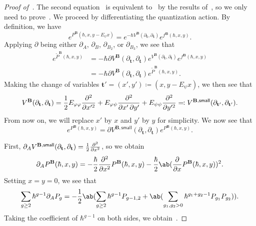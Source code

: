\documentclass[10pt]{amsart}
\theoremstyle{definition}
\theoremstyle{remark}
\theoremstyle{plain}
\theoremstyle{definition}
\theoremstyle{remark}
\newcommand{\bB}{\mathbf{B}}
\newcommand{\bt}{\mathbf{t}}
\newcommand{\ms}[1]{\mathsf{#1}}
\newcommand{\1}{\mathbf{1}}
\newcommand{\2}{\mathbf{2}}
\newcommand{\3}{\mathbf{3}}
\numberwithin{equation}{section}
\begin{document}
\begin{proof}[Proof of~]
    The second equation~ is equivalent to~ by the results of~\cite{yy04}, so we only need to prove~.
    We proceed by differentiating the quantization action. By definition, we have
    \[ e^{P^{\bB}(\hbar, x, y-E_{\psi}x)} = e^{-\hbar V^{\bB}(\partial_{\bt}, \partial_{\bt})} e^{f^{\bB}(\hbar, x, y)}. \]
    Applying $\partial$ being either $\partial_A$, $\partial_B$, $\partial_{B_2}$, or $\partial_{B_3}$, we see that
    \begin{align*}
        e^{\tilde{P}^{\bB}(\hbar, x, y)} &= -\hbar \partial V^{\bB}(\partial_{\bt}, \partial_{\bt}) e^{V^{\bB}(\partial_{\bt}, \partial_{\bt})} e^{f^{\bB}(\hbar, x, y)} \\
        &= -\hbar \partial V^{\bB}(\partial_{\bt}, \partial_{\bt}) e^{\tilde{P}^{\bB}(\hbar, x, y)}.
    \end{align*}
    Making the change of variables $\bt' = (x',y') \coloneqq (x, y-E_{\psi}x)$, we then see that
    \[ V^{\bB}(\partial_{\bt}, \partial_{\bt}) = \frac{1}{2} E_{\varphi\varphi} \pdv[order=2]{}{x'} + E_{\varphi\psi} \pdv{}{x',y'} + E_{\psi\psi} \pdv[order=2]{}{y'} \eqqcolon V^{\bB,\ms{small}}(\partial_{\bt'}, \partial_{\bt'}). \]
    From now on, we will replace $x'$ by $x$ and $y'$ by $y$ for simplicity. We now see that
    \[ e^{P^{\bB}(\hbar, x, y)} = \partial V^{\bB, \ms{small}}(\partial_{\bt}, \partial_{\bt}) e^{P^{\bB}(\hbar, x, y)}. \]

    First, $\partial_A V^{\bB, \ms{small}}(\partial_{\bt}, \partial_{\bt}) = \frac{1}{2} \pdv[order=2]{}{x}$, so we obtain
    \[ \partial_A P^{\bB}(\hbar, x, y) = -\frac{\hbar}{2} \pdv[order=2]{}{x} P^{\bB}(\hbar, x, y) - \frac{\hbar}{2} \ab(\pdv{}{x} P^{\bB}(\hbar, x, y))^2. \]
    Setting $x=y=0$, we see that
    \[ \sum_{g \geq 2} \hbar^{g-1} \partial_A P_g = -\frac{1}{2} \ab(\sum_{g \geq 2} \hbar^{g-1} P_{g-1,2} + \ab(\sum_{g_1,g_2>0} \hbar^{g_1+g_2-1} P_{g_1} P_{g_2})). \]
    Taking the coefficient of $\hbar^{g-1}$ on both sides, we obtain~.
\end{proof}







\printbibliography
\end{document}
